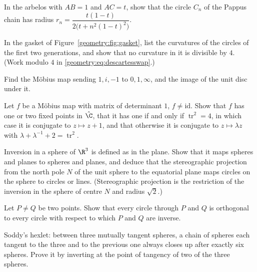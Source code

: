 \begin{exercise}[$\star\star$]\label{geometry:ex:pappusradius}
In the arbelos with $AB=1$ and $AC=t$, show that the circle $C_n$ of the Pappus chain has radius $r_n=\dfrac{t(1-t)}{2\bigl(t+n^2(1-t)^2\bigr)}$.
\end{exercise}

\begin{exercise}[$\star$]\label{geometry:ex:gasketroot}
In the gasket of Figure~\ref{geometry:fig:gasket}, list the curvatures of the circles of the first two generations, and show that no curvature in it
is divisible by $4$. (Work modulo $4$ in \eqref{geometry:eq:descartesswap}.)
\end{exercise}

\begin{exercise}[$\star$]\label{geometry:ex:mobius3}
Find the M\"obius map sending $1,i,-1$ to $0,1,\infty$, and the image of the unit disc under it.
\end{exercise}

\begin{exercise}[$\star\star$]\label{geometry:ex:trace}
Let $f$ be a M\"obius map with matrix of determinant $1$, $f\ne\mathrm{id}$. Show that $f$ has one or two fixed points in $\hat{\C}$, that it has one if
and only if $\operatorname{tr}^2=4$, in which case it is conjugate to $z\mapsto z+1$, and that otherwise it is conjugate to $z\mapsto\lambda z$ with
$\lambda+\lambda^{-1}+2=\operatorname{tr}^2$.
\end{exercise}

\begin{exercise}[$\star\star$]\label{geometry:ex:stereo}
Inversion in a sphere of $\R^3$ is defined as in the plane. Show that it maps spheres and planes to spheres and planes, and deduce that the
stereographic projection from the north pole $N$ of the unit sphere to the equatorial plane maps circles on the sphere to circles or lines.
(Stereographic projection is the restriction of the inversion in the sphere of centre $N$ and radius $\sqrt2$.)
\end{exercise}

\begin{exercise}[$\star$]\label{geometry:ex:orthcircles}
Let $P\ne Q$ be two points. Show that every circle through $P$ and $Q$ is orthogonal to every circle with respect to which $P$ and $Q$ are
inverse.
\end{exercise}

\begin{exercise}[$\star\star\star$]\label{geometry:ex:hexlet}
Soddy's hexlet: between three mutually tangent spheres, a chain of spheres each tangent to the three and to the previous one always closes
up after exactly six spheres. Prove it by inverting at the point of tangency of two of the three spheres.
\end{exercise}

